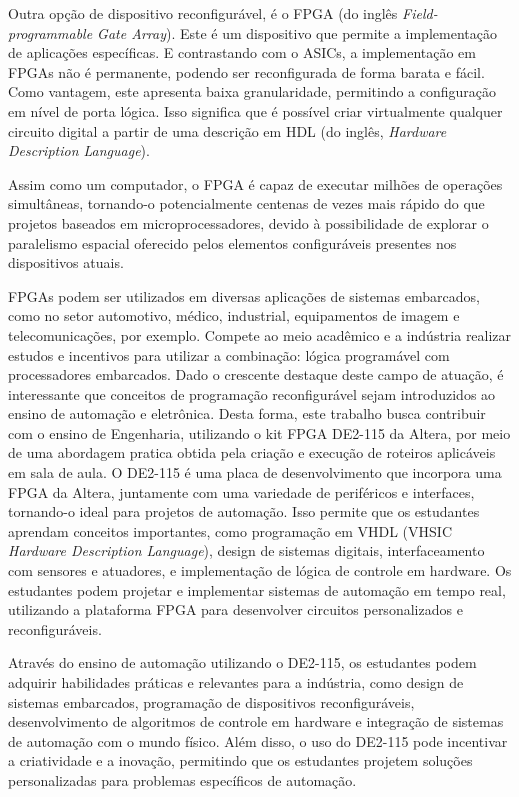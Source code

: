 Outra opção de dispositivo reconfigurável, é o FPGA (do inglês \textit{Field-programmable Gate Array}). Este é um dispositivo que permite a implementação de aplicações específicas. E contrastando com o ASICs, a implementação em FPGAs não é permanente, podendo ser reconfigurada de forma barata e fácil. Como vantagem, este apresenta baixa granularidade, permitindo a configuração em nível de porta lógica. Isso significa que é possível criar virtualmente qualquer circuito digital a partir de uma descrição em HDL (do inglês, \textit{Hardware Description Language}). 

Assim como um computador, o FPGA é capaz de executar milhões de operações simultâneas, tornando-o potencialmente centenas de vezes mais rápido do que projetos baseados em microprocessadores, devido à possibilidade de explorar o paralelismo espacial oferecido pelos elementos configuráveis presentes nos dispositivos atuais. 

FPGAs podem ser utilizados em diversas aplicações de sistemas embarcados, como no setor automotivo, médico, industrial, equipamentos de imagem e telecomunicações, por exemplo. Compete ao meio acadêmico e a indústria realizar estudos e incentivos para utilizar a combinação: lógica programável com processadores embarcados. Dado o crescente destaque deste campo de atuação, é interessante que conceitos de programação reconfigurável sejam introduzidos ao ensino de automação e eletrônica. Desta forma, este trabalho busca contribuir com o ensino de Engenharia, utilizando o kit FPGA DE2-115 da Altera, por meio de uma abordagem pratica obtida pela criação e execução de roteiros aplicáveis em sala de aula. O DE2-115 é uma placa de desenvolvimento que incorpora uma FPGA da Altera, juntamente com uma variedade de periféricos e interfaces, tornando-o ideal para projetos de automação. Isso permite que os estudantes aprendam conceitos importantes, como programação em VHDL (VHSIC\textit{ Hardware Description Language}), design de sistemas digitais, interfaceamento com sensores e atuadores, e implementação de lógica de controle em hardware. Os estudantes podem projetar e implementar sistemas de automação em tempo real, utilizando a plataforma FPGA para desenvolver circuitos personalizados e reconfiguráveis.

Através do ensino de automação utilizando o DE2-115, os estudantes podem adquirir habilidades práticas e relevantes para a indústria, como design de sistemas embarcados, programação de dispositivos reconfiguráveis, desenvolvimento de algoritmos de controle em hardware e integração de sistemas de automação com o mundo físico. Além disso, o uso do DE2-115 pode incentivar a criatividade e a inovação, permitindo que os estudantes projetem soluções personalizadas para problemas específicos de automação.



